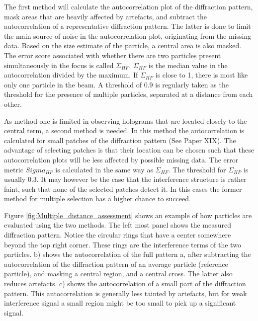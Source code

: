 The first method will calculate the autocorrelation plot of the diffraction pattern, mask areas that are heavily affected by artefacts, and subtract the autocorrelation of a representative diffraction pattern. The latter is done to limit the main source of noise in the autocorrelation plot, originating from the missing data. Based on the size estimate of the particle, a central area is also masked. The error score associated with whether there are two particles present simultaneously in the focus is called $\Sigma_{HF}$. $\Sigma_{HF}$ is the median value in the autocorrelation divided by the maximum. If $\Sigma_{HF}$ is close to 1, there is most like only one particle in the beam. A threshold of 0.9 is regularly taken as the threshold for the presence of multiple particles, separated at a distance from each other.

As method one is limited in observing holograms that are located closely to the central term, a second method is needed. In this method the autocorrelation is calculated for small patches of the diffraction pattern (See Paper XIX). The advantage of selecting  patches is that their location can be chosen such that these autocorrelation plots will be less affected by possible missing data. The error metric $Sigma_{HP}$ is calculated in the same way as $\Sigma_{HF}$. The threshold for $\Sigma_{HP}$ is usually 0.3. It may however be the case that the interference structure is rather faint, such that none of the selected patches detect it. In this cases the former method for multiple selection has a higher chance to succeed.

Figure \ref{fig:Multiple_distance_assessment} shows an example of how particles are evaluated using the two methods. The left most panel shows the measured diffraction pattern. Notice the circular rings that have a center somewhere beyond the top right corner. These rings are the interference terms of the two particles. b) shows the autocorrelation of the full pattern a, after subtracting the autocorrelation of the diffraction pattern of an average particle (reference particle), and masking a central region, and a central cross. The latter also reduces artefacts. c) shows the autocorrelation of a small part of the diffraction pattern. This autocorrelation is generally less tainted by artefacts, but for weak interference signal a small region might be too small to pick up a significant signal.

